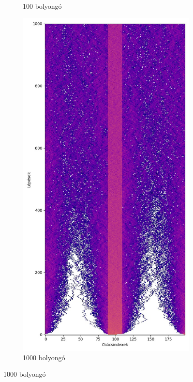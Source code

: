 \begin{figure}[H]
\begin{subfigure}{.4\linewidth}
    \caption{100 bolyongó}
  \end{subfigure}
  \begin{subfigure}{.4\linewidth}
    \centering
    \includegraphics[width=\linewidth]{./figures/sulyzo/sim03.jpg}
    \caption{1000 bolyongó}
  \end{subfigure}
\end{figure}

